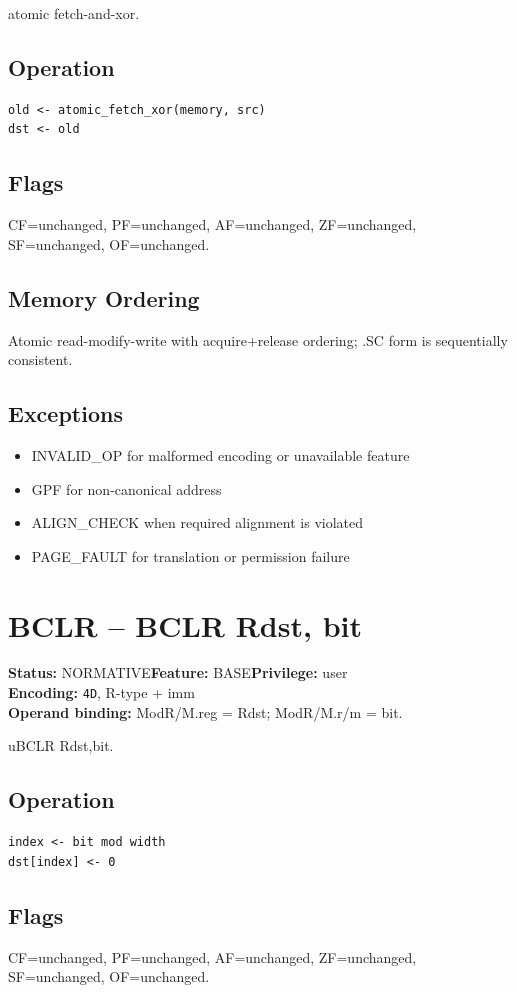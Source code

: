 \documentclass[10pt]{article}
\begin{document}
atomic fetch-and-xor.

\subsection*{Operation}
\begin{lstlisting}
old <- atomic_fetch_xor(memory, src)
dst <- old
\end{lstlisting}
\subsection*{Flags}
CF=unchanged, PF=unchanged, AF=unchanged, ZF=unchanged, SF=unchanged, OF=unchanged.
\subsection*{Memory Ordering}
Atomic read-modify-write with acquire+release ordering; .SC form is sequentially consistent.
\subsection*{Exceptions}
\begin{itemize}
\item INVALID\_OP for malformed encoding or unavailable feature
\item GPF for non-canonical address
\item ALIGN\_CHECK when required alignment is violated
\item PAGE\_FAULT for translation or permission failure
\end{itemize}
\clearpage

\section{BCLR -- BCLR Rdst, bit}
\textbf{Status:} NORMATIVE\quad \textbf{Feature:} BASE\quad \textbf{Privilege:} user\\
\textbf{Encoding:} \texttt{4D}, R-type + imm\\
\textbf{Operand binding:} ModR/M.reg = Rdst; ModR/M.r/m = bit.

uBCLR Rdst,bit.

\subsection*{Operation}
\begin{lstlisting}
index <- bit mod width
dst[index] <- 0
\end{lstlisting}
\subsection*{Flags}
CF=unchanged, PF=unchanged, AF=unchanged, ZF=unchanged, SF=unchanged, OF=unchanged.
\end{document}
